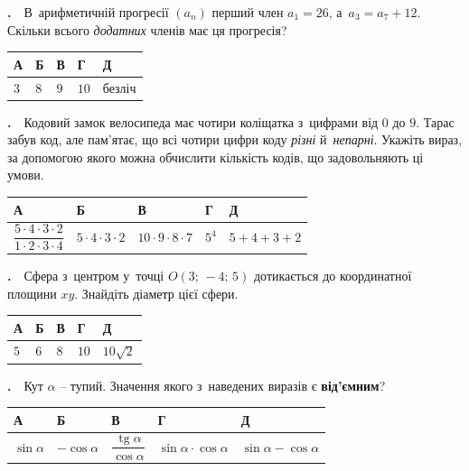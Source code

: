 \documentclass[12pt]{article}
\newlength{\nmtcellw}
\newcommand{\nmtSetCell}{\setlength{\nmtcellw}{\dimexpr(\linewidth-10\tabcolsep-6\arrayrulewidth)/5\relax}}
\newcommand{\answerTable}[5]{%
\par\nopagebreak\vspace{0.15cm}
\noindent\nmtSetCell
\begin{tabular}{|*{5}{>{\centering\arraybackslash}m{\nmtcellw}|}}
\hline
\rule[-0.15cm]{0pt}{0.6cm}\textbf{А} & \rule[-0.15cm]{0pt}{0.6cm}\textbf{Б} & \rule[-0.15cm]{0pt}{0.6cm}\textbf{В} & \rule[-0.15cm]{0pt}{0.6cm}\textbf{Г} & \rule[-0.15cm]{0pt}{0.6cm}\textbf{Д} \\
\hline
\rule[-0.2cm]{0pt}{0.75cm}#1 & \rule[-0.2cm]{0pt}{0.75cm}#2 & \rule[-0.2cm]{0pt}{0.75cm}#3 & \rule[-0.2cm]{0pt}{0.75cm}#4 & \rule[-0.2cm]{0pt}{0.75cm}#5 \\
\hline
\end{tabular}
\par\vspace{0.25cm}
}
\newcommand{\answerTableTall}[5]{%
\par\nopagebreak\vspace{0.15cm}
\noindent\nmtSetCell
\begin{tabular}{|*{5}{>{\centering\arraybackslash}m{\nmtcellw}|}}
\hline
\rule[-0.2cm]{0pt}{0.7cm}\textbf{А} & \rule[-0.2cm]{0pt}{0.7cm}\textbf{Б} & \rule[-0.2cm]{0pt}{0.7cm}\textbf{В} & \rule[-0.2cm]{0pt}{0.7cm}\textbf{Г} & \rule[-0.2cm]{0pt}{0.7cm}\textbf{Д} \\
\hline
\rule[-0.45cm]{0pt}{1.2cm}#1 & \rule[-0.45cm]{0pt}{1.2cm}#2 & \rule[-0.45cm]{0pt}{1.2cm}#3 & \rule[-0.45cm]{0pt}{1.2cm}#4 & \rule[-0.45cm]{0pt}{1.2cm}#5 \\
\hline
\end{tabular}
\par\vspace{0.25cm}
}
\newcounter{zad}
\newcommand{\zadtask}[1]{\stepcounter{zad}\noindent\textbf{\thezad.}\ \ #1\par\nopagebreak\vspace{0.2cm}}
\newcounter{ans}
\begin{document}
\begin{samepage}
\zadtask{В~арифметичній прогресії $(a_n)$ перший член $a_1=26$, а~$a_3=a_7+12$. Скільки всього \textit{додатних} членів має ця прогресія?}
\answerTable{$3$}{$8$}{$9$}{$10$}{безліч}
\par{}
\end{samepage}

\begin{samepage}
\zadtask{Кодовий замок велосипеда має чотири коліщатка з~цифрами від $0$ до $9$. Тарас забув код, але пам'ятає, що всі чотири цифри коду \textit{різні} й~\textit{непарні}. Укажіть вираз, за допомогою якого можна обчислити кількість кодів, що задовольняють ці умови.}
\answerTableTall{$\dfrac{5\cdot4\cdot3\cdot2}{1\cdot2\cdot3\cdot4}$}{$5\cdot4\cdot3\cdot2$}{$10\cdot9\cdot8\cdot7$}{$5^4$}{$5+4+3+2$}
\par{}
\end{samepage}

\begin{samepage}
\zadtask{Сфера з~центром у~точці $O(3;\,-4;\,5)$ дотикається до координатної площини $xy$. Знайдіть діаметр цієї сфери.}
\answerTable{$5$}{$6$}{$8$}{$10$}{$10\sqrt2$}
\par{}
\end{samepage}

\begin{samepage}
\zadtask{Кут $\alpha$ -- тупий. Значення якого з~наведених виразів є \textbf{від'ємним}?}
\answerTableTall{$\sin\alpha$}{$-\cos\alpha$}{$\dfrac{\operatorname{tg}\alpha}{\cos\alpha}$}{$\sin\alpha\cdot\cos\alpha$}{$\sin\alpha-\cos\alpha$}
\par{}
\end{samepage}
\end{document}
